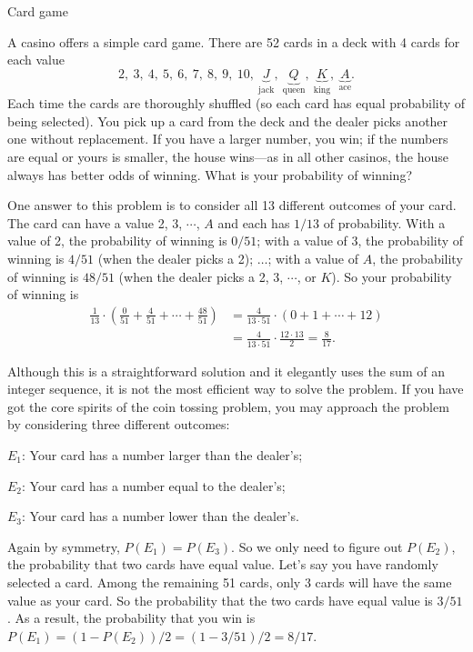 \begin{problem}{Card game}

A casino offers a simple card game. There are 52 cards in a deck with 4 cards for each value
\[
2,\ 3,\ 4,\ 5,\ 6,\ 7,\ 8,\ 9,\ 10,\
\underbrace{J}_{\text{jack}},\
\underbrace{Q}_{\text{queen}},\
\underbrace{K}_{\text{king}},\
\underbrace{A}_{\text{ace}}.
\]
Each time the cards are thoroughly shuffled
(so each card has equal probability of being selected). You pick up a card from the deck and
the dealer picks another one without replacement. If you have a larger number, you win; if
the numbers are equal or yours is smaller, the house wins---as in all other casinos, the house
always has better odds of winning. What is your probability of winning?
\end{problem}

\begin{solution}
One answer to this problem is to consider all 13 different outcomes of your card. The card
can have a value 2, 3, $\cdots$, $A$ and each has $1/13$ of probability. With a value of 2,
the probability of winning is $0/51$; with a value of 3, the probability of winning is $4/51$
(when the dealer picks a 2); $\ldots$; with a value of $A$, the probability of winning is
$48/51$ (when the dealer picks a 2, 3, $\cdots$, or $K$). So your probability of winning is
\[
\begin{aligned}
\frac{1}{13}\cdot\left(\frac{0}{51}+\frac{4}{51}+\cdots+\frac{48}{51}\right)
&=\frac{4}{13\cdot51}\cdot(0+1+\cdots+12)\\
&=\frac{4}{13\cdot51}\cdot\frac{12\cdot13}{2}=\frac{8}{17}.
\end{aligned}
\]

Although this is a straightforward solution and it elegantly uses the sum of an integer
sequence, it is not the most efficient way to solve the problem. If you have got the core
spirits of the coin tossing problem, you may approach the problem by considering three
different outcomes:

\noindent $E_1$: Your card has a number larger than the dealer's;

\noindent $E_2$: Your card has a number equal to the dealer's;

\noindent $E_3$: Your card has a number lower than the dealer's.

Again by symmetry, $P(E_1)=P(E_3)$. So we only need to figure out $P(E_2)$, the
probability that two cards have equal value. Let's say you have randomly selected a card.
Among the remaining 51 cards, only 3 cards will have the same value as your card. So the
probability that the two cards have equal value is $3/51$. As a result, the probability that you
win is $P(E_1)=(1-P(E_2))/2=(1-3/51)/2=8/17$.
\end{solution}

